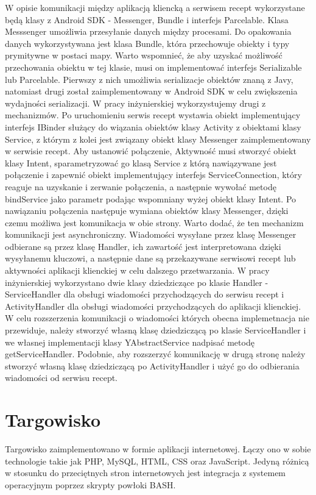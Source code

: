 \documentclass[11pt,a4paper,polish,thesis]{dcsbook}
\begin{document}
W opisie komunikacji między aplikacją kliencką a serwisem recept wykorzystane będą klasy z Android SDK - Messenger, Bundle i interfejs Parcelable. Klasa Messsenger umożliwia przesyłanie danych między procesami. \cite{android.mesage} Do opakowania danych wykorzystywana jest klasa Bundle, która przechowuje obiekty i typy prymitywne w postaci mapy. Warto wspomnieć, że aby uzyskać możliwość przechowania obiektu w tej klasie, musi on implementować interfejs Serializable lub Parcelable. Pierwszy z nich umożliwia serializacje obiektów znaną z Javy, natomiast drugi został zaimplementowany w Android SDK w celu zwiększenia wydajności serializacji. W pracy inżynierskiej wykorzystujemy drugi z mechanizmów. Po uruchomieniu serwis recept wystawia obiekt implementujący interfejs IBinder służący do wiązania obiektów klasy Activity z obiektami klasy Service,  z którym z kolei jest związany obiekt klasy Messenger zaimplementowany w serwisie recept. Aby ustanowić połączenie, Aktywność musi stworzyć obiekt klasy Intent, sparametryzować go klasą Service z którą nawiązywane jest połączenie i zapewnić obiekt implementujący interfejs ServiceConnection, który reaguje na uzyskanie i zerwanie połączenia, a następnie wywołać metodę bindService jako parametr podając wspomniany wyżej obiekt klasy Intent. Po nawiązaniu połączenia następuje wymiana obiektów klasy Messenger, dzięki czemu możliwa jest komunikacja w obie strony. Warto dodać, że ten mechanizm komunikacji jest asynchroniczny. Wiadomości wysyłane przez klasę Messenger odbierane są przez klasę Handler, ich zawartość jest interpretowana dzięki wysyłanemu kluczowi, a następnie dane są przekazywane serwisowi recept lub aktywności aplikacji klienckiej w celu dalszego przetwarzania. W pracy inżynierskiej wykorzystano dwie klasy dziedziczące po klasie Handler - ServiceHandler dla obsługi wiadomości przychodzących do serwisu recept i ActivityHandler dla obsługi wiadomości przychodzących do aplikacji klienckiej. W celu rozszerzenia komunikacji o wiadomości których obecna implemetnacja nie przewiduje, należy stworzyć własną klasę dziedziczącą po klasie ServiceHandler i we własnej implementacji klasy YAbstractService nadpisać metodę getServiceHandler. Podobnie, aby rozszerzyć komunikację w drugą stronę należy stworzyć własną klasę dziedziczącą po ActivityHandler i użyć go do odbierania wiadomości od serwisu recept.
\section{Targowisko}
Targowisko zaimplementowano w formie aplikacji internetowej. Łączy ono w sobie technologie takie jak PHP, MySQL, HTML, CSS oraz JavaScript. Jedyną różnicą w stosunku
do przeciętnych stron internetowych jest integracja z systemem operacyjnym poprzez skrypty powłoki BASH.
\end{document}
